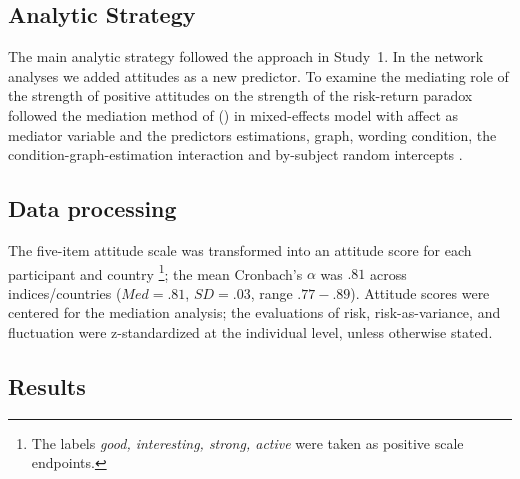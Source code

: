 \documentclass[a4paper,man, natbib,floatsintext]{apa6} %
\begin{document}
\subsection{Analytic Strategy}
The main analytic strategy followed the approach in Study~1. In the network analyses we added attitudes as a new predictor. To examine the mediating role of the strength of positive attitudes on the strength of the risk-return paradox followed the mediation method of \citeauthor{Imai2010} (\citeyear{Imai2010}) in mixed-effects model with affect as mediator variable and the predictors estimations, graph, wording condition, the condition-graph-estimation interaction and by-subject random intercepts \citep[using the R package mediation v4.4.7,][]{tingeley2014}.

\subsection{Data processing}
The five-item attitude scale was transformed into an attitude score for each participant and country \citep{Kempf2014a}\footnote{The labels \textit{good, interesting, strong, active} were taken as positive scale endpoints.}; the mean Cronbach's $\alpha$ was $.81$ across indices/countries ($Med=.81$, $SD=.03$, range $.77-.89$). Attitude scores were centered for the mediation analysis; the evaluations of risk, risk-as-variance, and fluctuation were z-standardized at the individual level, unless otherwise stated.

\subsection{Results}
\end{document}
